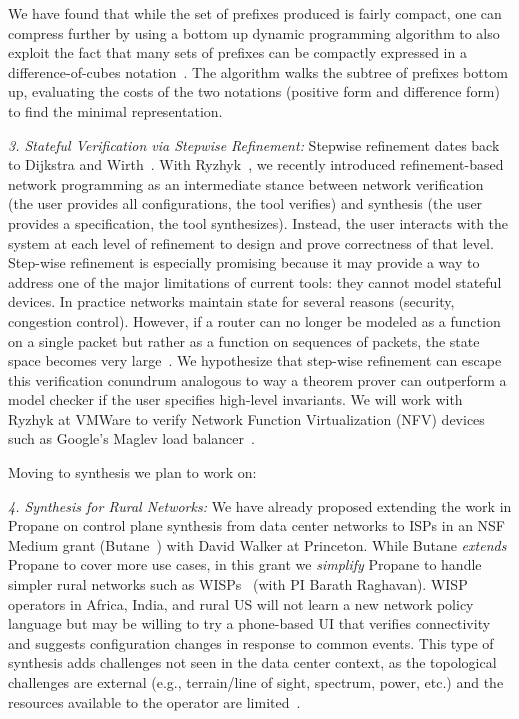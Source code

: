 We have found that while the set of prefixes produced is fairly compact, one can compress further by using a bottom
up dynamic programming algorithm to also exploit the fact that many sets of prefixes can be compactly expressed
in a difference-of-cubes notation~\cite{hsa, nod}.  The algorithm walks the subtree of prefixes bottom up, evaluating the
costs of the two notations (positive form and difference form) to find the minimal representation.

{\em 3. Stateful Verification via Stepwise Refinement:} Stepwise refinement dates back to Dijkstra and Wirth~\cite{wirth}. With Ryzhyk~\cite{leonid}, we recently introduced refinement-based network programming as an intermediate stance between network verification (the user provides all configurations, the tool verifies) and synthesis (the user provides a specification, the tool synthesizes).  Instead, the user interacts with the system at each level of refinement to design and prove correctness of that level.
%
Step-wise refinement is especially promising because it may provide a way to address one of the major limitations of current tools: they cannot model stateful devices. In practice networks maintain state for several reasons (security, congestion control). However, if a router can  no longer be modeled as a function on a single packet but rather as a function on sequences of packets, the state space becomes very large~\cite{mooly-tacas16}.  We hypothesize that step-wise refinement can escape this verification conundrum analogous to way a theorem prover can outperform a model checker if the user specifies high-level invariants.   We will work with Ryzhyk at VMWare to verify Network Function Virtualization (NFV) devices such as Google's Maglev load balancer~\cite{maglev}. 

Moving to synthesis we plan to work on:

{\em 4. Synthesis for Rural Networks:}  We have already proposed extending the work in Propane on control plane synthesis from data center networks to ISPs in an NSF Medium grant (Butane~\cite{butane}) with David Walker at Princeton.  While Butane {\em extends} Propane to cover more use cases, in this grant we {\em simplify} Propane to handle simpler rural networks such as WISPs~\cite{barathwisp} (with PI Barath Raghavan). WISP operators in Africa, India, and rural US will not learn a new network policy language but may be willing to try a phone-based UI that verifies connectivity and suggests configuration changes in response to common events. This type of synthesis adds challenges not seen in the data center context, as the topological challenges are external (e.g., terrain/line of sight, spectrum, power, etc.) and the resources available to the operator are limited~\cite{zyxt18}.

